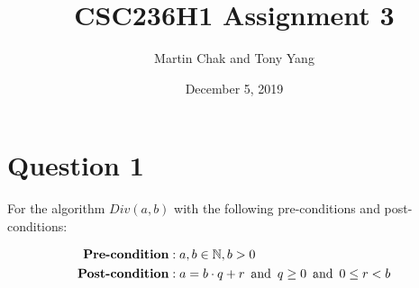 \documentclass[20pt]{article}
\title{CSC236H1 Assignment 3}
\author{Martin Chak and Tony Yang}
\date{December 5, 2019}
\begin{document}

\maketitle


\newpage

\section*{Question 1}

\begin{text}
    For the algorithm $Div(a,b)$ with the following pre-conditions and post-conditions:
\end{text}
\begin{align}
    \textbf{Pre-condition}&: a, b \in \mathbb{N}, b > 0\nonumber\\
    \textbf{Post-condition}&: a = b \cdot q + r \text{\, and \,} q \geq 0 \text{\, and \,} 0 \leq r < b\nonumber
\end{align}
\end{document}
